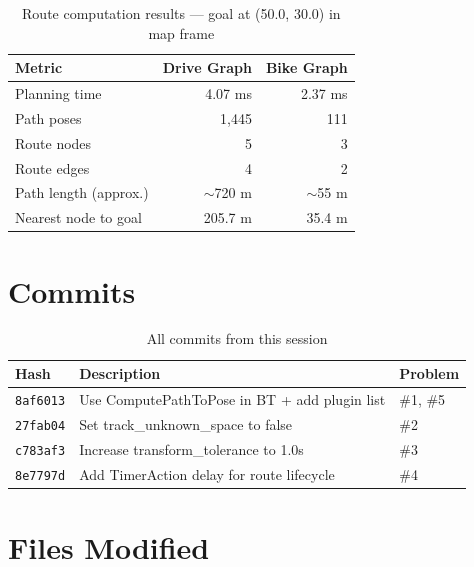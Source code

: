 \documentclass[11pt,a4paper]{article}
\begin{document}
\begin{table}[h]
\centering
\caption{Route computation results --- goal at (50.0, 30.0) in map frame}
\begin{tabular}{lrr}
\toprule
\textbf{Metric} & \textbf{Drive Graph} & \textbf{Bike Graph} \\
\midrule
Planning time & 4.07 ms & 2.37 ms \\
Path poses & 1,445 & 111 \\
Route nodes & 5 & 3 \\
Route edges & 4 & 2 \\
Path length (approx.) & $\sim$720 m & $\sim$55 m \\
Nearest node to goal & 205.7 m & 35.4 m \\
\bottomrule
\end{tabular}
\end{table}

\section{Commits}

\begin{table}[h]
\centering
\caption{All commits from this session}
\begin{tabular}{lll}
\toprule
\textbf{Hash} & \textbf{Description} & \textbf{Problem} \\
\midrule
\texttt{8af6013} & Use ComputePathToPose in BT + add plugin list & \#1, \#5 \\
\texttt{27fab04} & Set track\_unknown\_space to false & \#2 \\
\texttt{c783af3} & Increase transform\_tolerance to 1.0s & \#3 \\
\texttt{8e7797d} & Add TimerAction delay for route lifecycle & \#4 \\
\bottomrule
\end{tabular}
\end{table}

\section{Files Modified}
\end{document}
